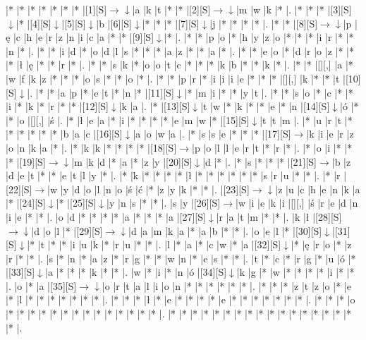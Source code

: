 \documentclass[11pt]{article}
\newcommand\drarr{$\rightarrow \!\!\!\!\! \downarrow$}
\newcommand\rarr{$\rightarrow$}
\newcommand\darr{$\downarrow$}
\begin{document}
\noindent\begin{Puzzle}{17}{33}|*	|*	|*	|*	|*	|*	|*	|[1][S]\drarr	|a	|k	|t	|*	|*	|[2][S]\drarr	|m	|w	|k	|*	|.
|*	|*	|*	|[3][S]\darr	|*	|[4][S]\darr	|[5][S]\darr	|b	|[6][S]\darr	|*	|*	|*	|[7][S]\darr	|j	|*	|*	|*	|*	|.
|*	|*	|[8][S]\drarr	|p	|ę	|c	|h	|e	|r	|z	|n	|i	|c	|a	|*	|*	|[9][S]\darr	|*	|.
|*	|*	|p	|o	|*	|h	|y	|z	|o	|*	|*	|*	|i	|r	|*	|*	|n	|*	|.
|*	|*	|i	|d	|*	|o	|d	|l	|s	|*	|*	|*	|a	|z	|*	|*	|a	|*	|.
|*	|*	|e	|o	|*	|d	|r	|o	|z	|*	|*	|*	|ł	|ę	|*	|*	|r	|*	|.
|*	|*	|s	|k	|*	|o	|o	|t	|c	|*	|*	|*	|k	|b	|*	|*	|k	|*	|.
|*	|*	|[][,]{ }	|a	|*	|w	|f	|k	|z	|*	|*	|*	|o	|s	|*	|*	|o	|*	|.
|*	|*	|p	|r	|*	|i	|i	|i	|e	|*	|*	|*	|[][,]{ }	|k	|*	|*	|t	|[10][S]\darr	|.
|*	|*	|a	|p	|*	|e	|t	|*	|n	|*	|[11][S]\darr	|*	|m	|i	|*	|*	|y	|t	|.
|*	|*	|s	|o	|*	|c	|*	|*	|i	|*	|k	|*	|r	|*	|*	|[12][S]\darr	|k	|a	|.
|*	|[13][S]\darr	|t	|w	|*	|k	|*	|*	|e	|*	|n	|[14][S]\darr	|ó	|*	|*	|o	|[][,]{ }	|ś	|.
|*	|ł	|e	|a	|*	|i	|*	|*	|*	|*	|e	|m	|w	|*	|[15][S]\darr	|t	|t	|m	|.
|*	|u	|r	|t	|*	|*	|*	|*	|*	|*	|b	|a	|c	|[16][S]\darr	|a	|o	|w	|a	|.
|*	|s	|s	|e	|*	|*	|*	|[17][S]\rarr	|k	|i	|e	|r	|z	|o	|n	|k	|a	|*	|.
|*	|k	|k	|*	|*	|*	|*	|[18][S]\rarr	|p	|o	|l	|l	|e	|r	|t	|*	|r	|*	|.
|*	|o	|i	|*	|*	|*	|[19][S]\drarr	|m	|k	|d	|*	|a	|*	|z	|y	|[20][S]\darr	|d	|*	|.
|*	|s	|*	|*	|*	|[21][S]\rarr	|b	|z	|d	|e	|t	|*	|*	|e	|t	|l	|y	|*	|.
|*	|k	|*	|*	|*	|*	|ł	|*	|*	|*	|*	|*	|*	|s	|r	|u	|*	|*	|.
|*	|r	|[22][S]\rarr	|w	|y	|d	|o	|l	|n	|o	|ś	|ć	|*	|z	|y	|k	|*	|*	|.
|[23][S]\drarr	|z	|u	|c	|h	|e	|n	|k	|a	|*	|[24][S]\darr	|*	|[25][S]\darr	|y	|n	|s	|*	|*	|.
|s	|y	|[26][S]\rarr	|w	|i	|e	|k	|i	|[][,]{ }	|ś	|r	|e	|d	|n	|i	|e	|*	|*	|.
|o	|d	|*	|*	|*	|*	|a	|*	|*	|*	|a	|[27][S]\darr	|r	|a	|t	|m	|*	|*	|.
|k	|ł	|[28][S]\drarr	|d	|o	|l	|*	|[29][S]\drarr	|d	|a	|m	|k	|a	|*	|a	|b	|*	|*	|.
|o	|e	|l	|*	|[30][S]\darr	|[31][S]\darr	|*	|t	|*	|*	|i	|u	|k	|*	|r	|u	|*	|*	|.
|l	|*	|a	|*	|c	|w	|*	|a	|[32][S]\darr	|*	|ę	|r	|o	|*	|z	|r	|*	|*	|.
|s	|*	|n	|*	|a	|z	|*	|r	|g	|*	|*	|w	|n	|*	|e	|s	|*	|*	|.
|t	|*	|c	|*	|r	|g	|*	|u	|ó	|*	|[33][S]\darr	|a	|*	|*	|*	|k	|*	|*	|.
|w	|*	|i	|*	|n	|ó	|[34][S]\darr	|k	|g	|*	|w	|*	|*	|*	|*	|i	|*	|*	|.
|o	|*	|a	|[35][S]\drarr	|o	|r	|t	|a	|l	|i	|o	|n	|*	|*	|*	|*	|*	|*	|.
|*	|*	|*	|z	|t	|z	|o	|*	|e	|*	|l	|*	|*	|*	|*	|*	|*	|*	|.
|*	|*	|*	|ł	|*	|e	|*	|*	|*	|*	|e	|*	|*	|*	|*	|*	|*	|*	|.
|*	|*	|*	|o	|*	|*	|*	|*	|*	|*	|*	|*	|*	|*	|*	|*	|*	|*	|.
|*	|*	|*	|*	|*	|*	|*	|*	|*	|*	|*	|*	|*	|*	|*	|*	|*	|*	|.\end{Puzzle}

\newpage
\end{document}
